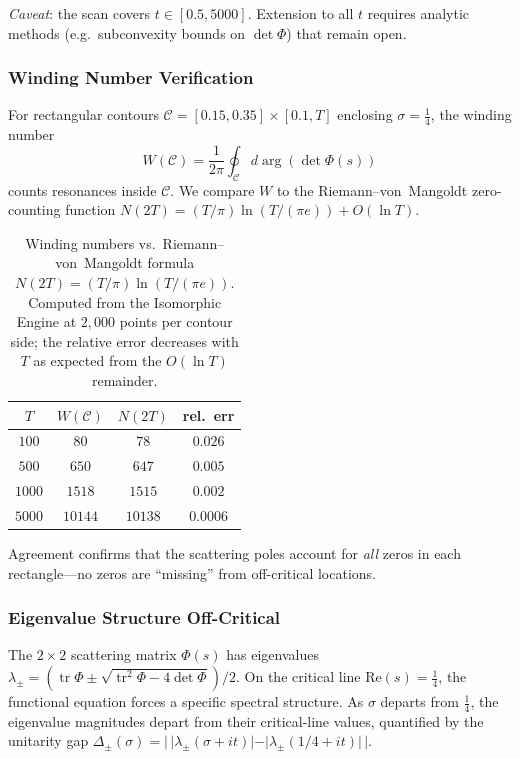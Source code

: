 \documentclass[11pt,a4paper]{article}
\theoremstyle{plain}
\theoremstyle{remark}
\DeclareMathOperator{\tr}{tr}
\begin{document}
\emph{Caveat}: the scan covers $t\in[0.5,5000]$.  Extension to all
$t$ requires analytic methods (e.g.\ subconvexity bounds on $\det\Phi$)
that remain open.

\subsubsection{Winding Number Verification}
\label{sec:winding}

For rectangular contours $\mathcal{C}=[0.15,0.35]\times[0.1,T]$
enclosing $\sigma=\tfrac{1}{4}$, the winding number
\[
  W(\mathcal{C}) = \frac{1}{2\pi}\oint_{\mathcal{C}}
                   d\arg(\det\Phi(s))
\]
counts resonances inside $\mathcal{C}$.  We compare $W$ to the
Riemann--von~Mangoldt zero-counting function $N(2T) =
(T/\pi)\ln(T/(\pi e)) + O(\ln T)$.

\begin{table}[H]
\centering\small
\begin{tabular}{@{}cccc@{}}
\toprule
$T$ & $W(\mathcal{C})$ & $N(2T)$ & rel.~err\\
\midrule
$100$   & $80$      & $78$      & $0.026$\\
$500$   & $650$     & $647$     & $0.005$\\
$1000$  & $1518$    & $1515$    & $0.002$\\
$5000$  & $10144$   & $10138$   & $0.0006$\\
\bottomrule
\end{tabular}
\caption{Winding numbers vs.\ Riemann--von~Mangoldt formula
  $N(2T)=(T/\pi)\ln(T/(\pi e))$.  Computed from the Isomorphic Engine
  at $2{,}000$ points per contour side; the relative error decreases
  with $T$ as expected from the $O(\ln T)$ remainder.}
\label{tab:winding}
\end{table}

\noindent Agreement confirms that the scattering poles account for
\emph{all} zeros in each rectangle---no zeros are ``missing'' from
off-critical locations.

\subsubsection{Eigenvalue Structure Off-Critical}
\label{sec:eigenvalue-structure}

The $2\times 2$ scattering matrix $\Phi(s)$ has eigenvalues
$\lambda_\pm = (\tr\Phi \pm \sqrt{\tr^2\Phi - 4\det\Phi})/2$.
On the critical line $\mathrm{Re}(s)=\tfrac{1}{4}$, the functional
equation forces a specific spectral structure.  As $\sigma$ departs
from $\tfrac{1}{4}$, the eigenvalue magnitudes depart from their
critical-line values, quantified by the unitarity gap
$\Delta_\pm(\sigma) = |\,|\lambda_\pm(\sigma+it)| - |\lambda_\pm(1/4+it)|\,|$.
\end{document}
